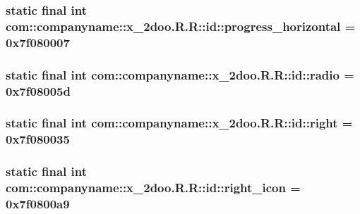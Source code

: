 \hypertarget{classcom_1_1companyname_1_1x__2doo_1_1_r_1_1id_dd3a20619d772d285466f1096f096f0a}{
\subsubsection[{progress\_\-horizontal}]{\setlength{\rightskip}{0pt plus 5cm}static final int com::companyname::x\_\-2doo.R.R::id::progress\_\-horizontal = 0x7f080007}}
\label{classcom_1_1companyname_1_1x__2doo_1_1_r_1_1id_dd3a20619d772d285466f1096f096f0a}


\hypertarget{classcom_1_1companyname_1_1x__2doo_1_1_r_1_1id_04cac82aa0c448b9e3a3421cff6344cb}{
\subsubsection[{radio}]{\setlength{\rightskip}{0pt plus 5cm}static final int com::companyname::x\_\-2doo.R.R::id::radio = 0x7f08005d}}
\label{classcom_1_1companyname_1_1x__2doo_1_1_r_1_1id_04cac82aa0c448b9e3a3421cff6344cb}


\hypertarget{classcom_1_1companyname_1_1x__2doo_1_1_r_1_1id_39fb300e19e5930eb145ca31db328200}{
\subsubsection[{right}]{\setlength{\rightskip}{0pt plus 5cm}static final int com::companyname::x\_\-2doo.R.R::id::right = 0x7f080035}}
\label{classcom_1_1companyname_1_1x__2doo_1_1_r_1_1id_39fb300e19e5930eb145ca31db328200}


\hypertarget{classcom_1_1companyname_1_1x__2doo_1_1_r_1_1id_30d400f35ed1c1636e0586a5a78a3237}{
\subsubsection[{right\_\-icon}]{\setlength{\rightskip}{0pt plus 5cm}static final int com::companyname::x\_\-2doo.R.R::id::right\_\-icon = 0x7f0800a9}}
\label{classcom_1_1companyname_1_1x__2doo_1_1_r_1_1id_30d400f35ed1c1636e0586a5a78a3237}


